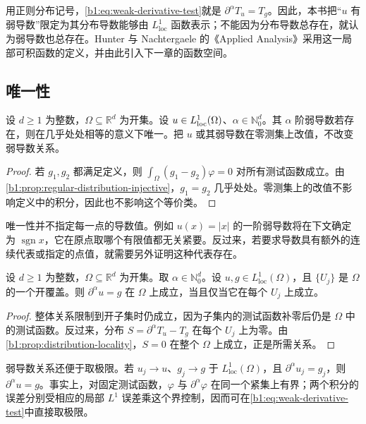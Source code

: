 \ProseParagraphBreak

用正则分布记号，\eqref{b1:eq:weak-derivative-test}就是 \(\partial^\alpha T_u=T_g\)。因此，本书把“\(u\) 有弱导数”限定为其分布导数能够由 \(L^1_{\mathrm{loc}}\) 函数表示；不能因为分布导数总存在，就认为弱导数也总存在。Hunter 与 Nachtergaele 的《Applied Analysis》\cite[Section 12.9, Definition 12.64]{Hunter2001Applied}采用这一局部可积函数的定义，并由此引入下一章的函数空间。

\subsection{唯一性}
\label{b1:subsec:200402}

\begin{proposition}
\label{b1:prop:weak-derivative-unique}
设 \(d\geq1\) 为整数，\(\Omega\subseteq\mathbb R^d\) 为开集。设 \(u\in L^1_{\rm loc}(\Omega)\)、\(\alpha\in\mathbb N_0^d\)。其 \(\alpha\) 阶弱导数若存在，则在几乎处处相等的意义下唯一。把 \(u\) 或其弱导数在零测集上改值，不改变弱导数关系。
\end{proposition}
\begin{proof}
若 \(g_1,g_2\) 都满足定义，则 \(\int_\Omega(g_1-g_2)\varphi=0\) 对所有测试函数成立。由\cref{b1:prop:regular-distribution-injective}，\(g_1=g_2\) 几乎处处。零测集上的改值不影响定义中的积分，因此也不影响这个等价类。
\end{proof}

唯一性并不指定每一点的导数值。例如 \(u(x)=|x|\) 的一阶弱导数将在下文确定为 \(\operatorname{sgn}x\)，它在原点取哪个有限值都无关紧要。反过来，若要求导数具有额外的连续代表或指定的点值，就需要另外证明这种代表存在。

\begin{proposition}
\label{b1:prop:weak-derivative-locality}
设 \(d\geq1\) 为整数，\(\Omega\subseteq\mathbb R^d\) 为开集。取 \(\alpha\in\mathbb N_0^d\)。设 \(u,g\in L^1_{\mathrm{loc}}(\Omega)\)，且 \(\{U_j\}\) 是 \(\Omega\) 的一个开覆盖。则 \(\partial^\alpha u=g\) 在 \(\Omega\) 上成立，当且仅当它在每个 \(U_j\) 上成立。
\end{proposition}
\begin{proof}
整体关系限制到开子集时仍成立，因为子集内的测试函数补零后仍是 \(\Omega\) 中的测试函数。反过来，分布 \(S=\partial^\alpha T_u-T_g\) 在每个 \(U_j\) 上为零。由\cref{b1:prop:distribution-locality}，\(S=0\) 在整个 \(\Omega\) 上成立，正是所需关系。
\end{proof}

弱导数关系还便于取极限。若 \(u_j\rightarrow u\)、\(g_j\rightarrow g\) 于 \(L^1_{\mathrm{loc}}(\Omega)\)，且 \(\partial^\alpha u_j=g_j\)，则 \(\partial^\alpha u=g\)。事实上，对固定测试函数，\(\varphi\) 与 \(\partial^\alpha\varphi\) 在同一个紧集上有界；两个积分的误差分别受相应的局部 \(L^1\) 误差乘这个界控制，因而可在\eqref{b1:eq:weak-derivative-test}中直接取极限。

